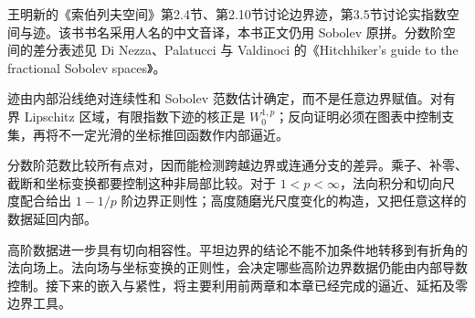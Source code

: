 \ProseParagraphBreak

王明新的《索伯列夫空间》\cite{Wang2013SobolevChinese}第2.4节、第2.10节讨论边界迹，第3.5节讨论实指数空间与迹。该书书名采用人名的中文音译，本书正文仍用 Sobolev 原拼。分数阶空间的差分表述见 Di Nezza、Palatucci 与 Valdinoci 的《Hitchhiker's guide to the fractional Sobolev spaces》\cite{DiNezza2012Hitchhikers}。






\begin{chaptersummary}
迹由内部沿线绝对连续性和 Sobolev 范数估计确定，而不是任意边界赋值。对有界 Lipschitz 区域，有限指数下迹的核正是 \(W_0^{1,p}\)；反向证明必须在图表中控制支集，再将不一定光滑的坐标推回函数作内部逼近。

\ProseParagraphBreak

分数阶范数比较所有点对，因而能检测跨越边界或连通分支的差异。乘子、补零、截断和坐标变换都要控制这种非局部比较。对于 \(1<p<\infty\)，法向积分和切向尺度配合给出 \(1-1/p\) 阶边界正则性；高度随磨光尺度变化的构造，又把任意这样的数据延回内部。

\ProseParagraphBreak

高阶数据进一步具有切向相容性。平坦边界的结论不能不加条件地转移到有折角的法向场上。法向场与坐标变换的正则性，会决定哪些高阶边界数据仍能由内部导数控制。接下来的嵌入与紧性，将主要利用前两章和本章已经完成的逼近、延拓及零边界工具。
\end{chaptersummary}

\BookExercises



